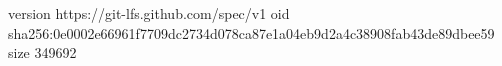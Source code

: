 version https://git-lfs.github.com/spec/v1
oid sha256:0e0002e66961f7709dc2734d078ca87e1a04eb9d2a4c38908fab43de89dbee59
size 349692
